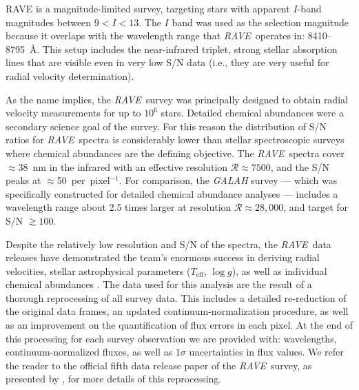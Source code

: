 \documentclass[preprint2,trackchanges]{aastex}
\newcommand{\project}[1]{\textsl{#1}}
\newcommand{\acronym}[1]{{\small{#1}}}
\newcommand{\rave}{\project{\acronym{RAVE}}}
\newcommand{\logg}{\log g}
\newcommand{\teff}{T_{\mathrm{eff}}}
\begin{document}
RAVE is a magnitude-limited survey, targeting stars with apparent $I$-band
magnitudes between $9 < I < 13$.  The $I$ band was used as the selection
magnitude because it overlaps with the wavelength range that \rave\ operates in:
8410--8795~\AA.  This setup includes the  near-infrared triplet,
strong stellar absorption lines that are visible even in very low S/N data 
(i.e., they are very useful for radial velocity determination).  








As the name implies, the \rave\ survey was principally designed to obtain radial
velocity measurements for up to $10^6$ stars.  Detailed chemical abundances were
a secondary science goal of the survey.  For this reason the distribution
of S/N ratios for \rave\ spectra is considerably lower than stellar 
spectroscopic surveys where chemical abundances are the defining objective.  The 
\rave\ spectra cover $\approx38$~nm in the infrared with an effective resolution
$\mathcal{R} \approx 7500$, and the S/N peaks at $\approx$50~per~pixel$^{-1}$.
For comparison, the \project{GALAH} survey \citep{DaSilva_2015} --- which was 
specifically constructed for detailed chemical abundance analyses --- includes a
wavelength range about 2.5 times larger at resolution $\mathcal{R} \approx 28,000$,
and target for S/N $\gtrsim100$.


Despite the relatively low resolution and S/N of the spectra, the \rave\ data
releases have demonstrated the team's enormous success in deriving radial 
velocities, stellar astrophysical parameters ($\teff$, $\logg$), as well as 
individual chemical abundances \citep{Steinmetz_2006,Zwitter_2008,Siebert_2011,
Kordopatis_2014, Kunder_2016}.  The data used for this analysis are the result
of a thorough reprocessing of all survey data.  This includes a detailed
re-reduction of the original data frames, an updated continuum-normalization
procedure, as well as an improvement on the quantification of flux errors in
each pixel.  At the end of this processing for each survey observation we are 
provided with: wavelengths, continuum-normalized fluxes, as well as 
$1\sigma$ uncertainties in flux values.  We refer the reader to the official 
fifth data release paper of the \rave\ survey, as presented by
\citet{Kunder_2016}, for more details of this reprocessing.
\end{document}
